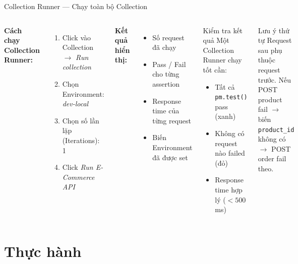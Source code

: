 \documentclass[aspectratio=169,10pt]{beamer}
\begin{document}
\begin{frame}[fragile]{Collection Runner --- Chạy toàn bộ Collection}
  \begin{columns}
    \textbf{Cách chạy Collection Runner:}
    \begin{enumerate}
      \item Click vào Collection $\to$ \textit{Run collection}
      \item Chọn Environment: \textit{dev-local}
      \item Chọn số lần lặp (Iterations): 1
      \item Click \textit{Run E-Commerce API}
    \end{enumerate}

    \vspace{0.4em}
    \textbf{Kết quả hiển thị:}
    \begin{itemize}
      \item Số request đã chạy
      \item Pass / Fail cho từng assertion
      \item Response time của từng request
      \item Biến Environment đã được set
    \end{itemize}

    \begin{block}{Kiểm tra kết quả}
      Một Collection Runner chạy tốt cần:
      \begin{itemize}
        \item Tất cả \texttt{pm.test()} pass (xanh)
        \item Không có request nào failed (đỏ)
        \item Response time hợp lý ($< 500$ms)
      \end{itemize}
    \end{block}

    \begin{alertblock}{Lưu ý thứ tự}
      Request sau phụ thuộc request trước.
      Nếu POST product fail $\to$ biến \texttt{product\_id}
      không có $\to$ POST order fail theo.
    \end{alertblock}
  \end{columns}
\end{frame}

\section{Thực hành}
\end{document}
